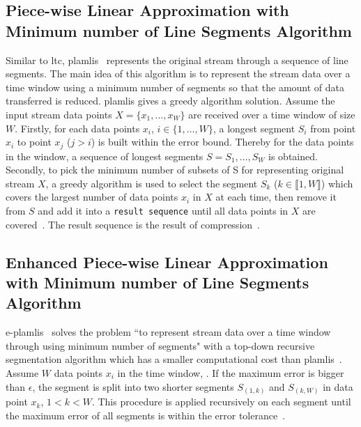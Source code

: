\subsection{Piece-wise Linear Approximation
with Minimum number of Line Segments Algorithm}

Similar to \acrshort{ltc}, \acrfull{plamlis}~\cite{liu2007energy} represents the
original stream through a sequence of line segments. The main idea of this
algorithm is to represent the stream data over a time window using a minimum
number of segments so that the amount of data transferred is reduced.
\acrshort{plamlis} gives a greedy algorithm solution. Assume the input stream
data points $X=\{x_1, ..., x_W\}$ are received over a time window of size $W$.
Firstly, for each data points $x_i$, $i \in \{1, ..., W\}$, a longest segment
$S_{i}$ from point $x_i$ to point $x_j$ ($j>i$) is built within the error bound.
Thereby for the data points in the window, a sequence of longest segments $S =
{S_1, ..., S_W}$ is obtained. Secondly, to pick the minimum number of subsets of
S for representing original stream $X$, a greedy algorithm is used to select the
segment $S_k$ ($k \in \llbracket1, W\rrbracket$) which covers the largest number
of data points $x_i$ in $X$ at each time, then remove it from $S$ and add it
into a \texttt{result sequence} until all data points in $X$ are
covered~\cite{liu2007energy}. The result sequence is the result of
compression~\cite{zordan2012compress, zordan2014performance}.


\subsection{Enhanced Piece-wise Linear Approximation with Minimum number of Line
Segments Algorithm}

\acrfull{e-plamlis}~\cite{pham2008enhance} solves the problem ``to represent
stream data over a time window through using minimum number of segments"  with a
top-down recursive segmentation algorithm which has a smaller computational cost
than \acrshort{plamlis}~\cite{pham2008enhance, zordan2014performance}. Assume
$W$ data points $x_i$ in the time window, . If
the maximum error is bigger than $\epsilon$, the segment is split into two
shorter segments $S_{(1, k)}$ and $S_{(k, W)}$ in data point $x_k$, $1<k<W$.
This procedure is applied recursively on each segment until the maximum error of
all segments is within the error tolerance~\cite{pham2008enhance,
zordan2014performance}.

